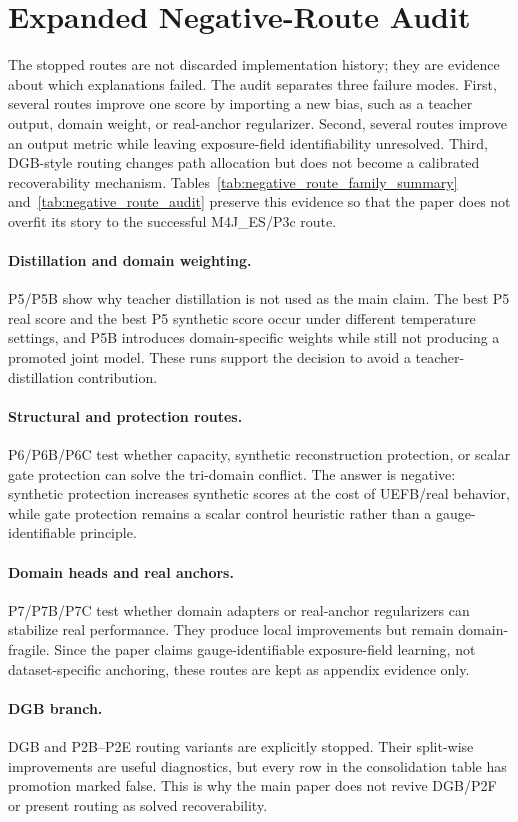 \section{Expanded Negative-Route Audit}
\label{app:negative_routes_expanded}

The stopped routes are not discarded implementation history; they are evidence about which explanations failed. The audit separates three failure modes. First, several routes improve one score by importing a new bias, such as a teacher output, domain weight, or real-anchor regularizer. Second, several routes improve an output metric while leaving exposure-field identifiability unresolved. Third, DGB-style routing changes path allocation but does not become a calibrated recoverability mechanism. Tables~\ref{tab:negative_route_family_summary} and~\ref{tab:negative_route_audit} preserve this evidence so that the paper does not overfit its story to the successful M4J\_ES/P3c route.

\paragraph{Distillation and domain weighting.} P5/P5B show why teacher distillation is not used as the main claim. The best P5 real score and the best P5 synthetic score occur under different temperature settings, and P5B introduces domain-specific weights while still not producing a promoted joint model. These runs support the decision to avoid a teacher-distillation contribution.

\paragraph{Structural and protection routes.} P6/P6B/P6C test whether capacity, synthetic reconstruction protection, or scalar gate protection can solve the tri-domain conflict. The answer is negative: synthetic protection increases synthetic scores at the cost of UEFB/real behavior, while gate protection remains a scalar control heuristic rather than a gauge-identifiable principle.

\paragraph{Domain heads and real anchors.} P7/P7B/P7C test whether domain adapters or real-anchor regularizers can stabilize real performance. They produce local improvements but remain domain-fragile. Since the paper claims gauge-identifiable exposure-field learning, not dataset-specific anchoring, these routes are kept as appendix evidence only.

\paragraph{DGB branch.} DGB and P2B--P2E routing variants are explicitly stopped. Their split-wise improvements are useful diagnostics, but every row in the consolidation table has promotion marked false. This is why the main paper does not revive DGB/P2F or present routing as solved recoverability.


